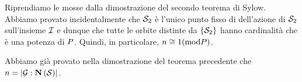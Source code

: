 \Proof
Riprendiamo le mosse dalla dimostrazione del secondo teorema di
Sylow. Abbiamo provato incidentalmente che $\Sylow_2$ \`e l'unico punto
fisso di dell'azione di $\Sylow_2$ sull'insieme $\mathcal{I}$ e dunque che tutte
le orbite distinte da $\lbrace \Sylow_2 \rbrace$ hanno cardinalit\`a che
\`e una potenza di $P$. Quindi, in particolare,
$n \cong 1 (\text{mod} P)$.
\par
Abbiamo gi\`a provato nella dimostrazione del teorema precedente che $n =
\Index{\Group}{\Normalizer{\Sylow}}$.
\EndProof
